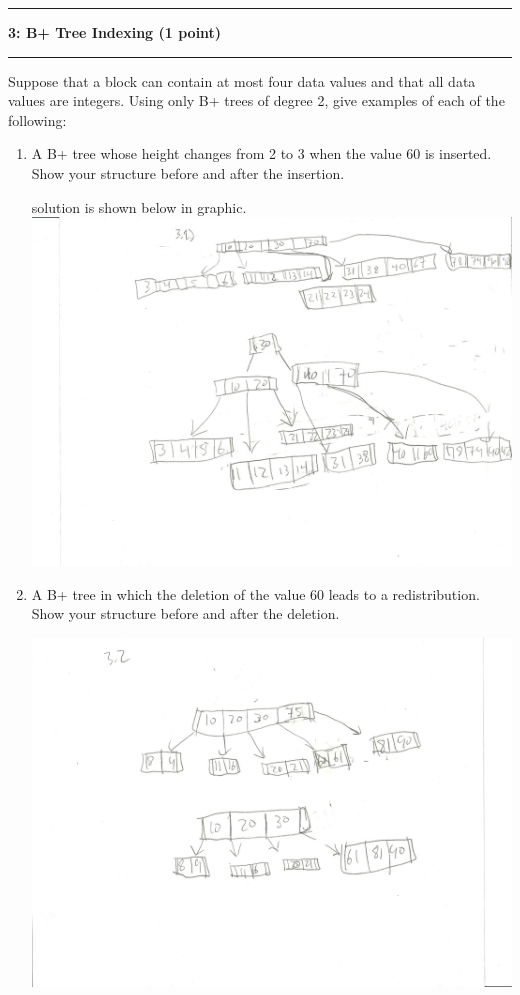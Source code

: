 \documentclass[11pt]{article}
\newcommand\question[2]{\vspace{.25in}\hrule\textbf{#1: #2}\vspace{.5em}\hrule\vspace{.10in}}
\begin{document}
\question{3}{B+ Tree Indexing (1 point)}
Suppose that a block can contain at most four data values and that all data values are integers. Using only B+ trees of degree 2, give examples of each of the following:
\begin{enumerate}
	\item A B+ tree whose height changes from 2 to 3 when the value 60 is inserted. Show your structure before and after the insertion.
	
	solution is shown below in graphic.\\
	
	\includegraphics{threePointOne.jpeg}
	
	\item A B+ tree in which the deletion of the value 60 leads to a redistribution. Show your structure before and after the deletion.
	
	\includegraphics{threePointTwo.jpeg}
	

\end{enumerate}
\end{document}
